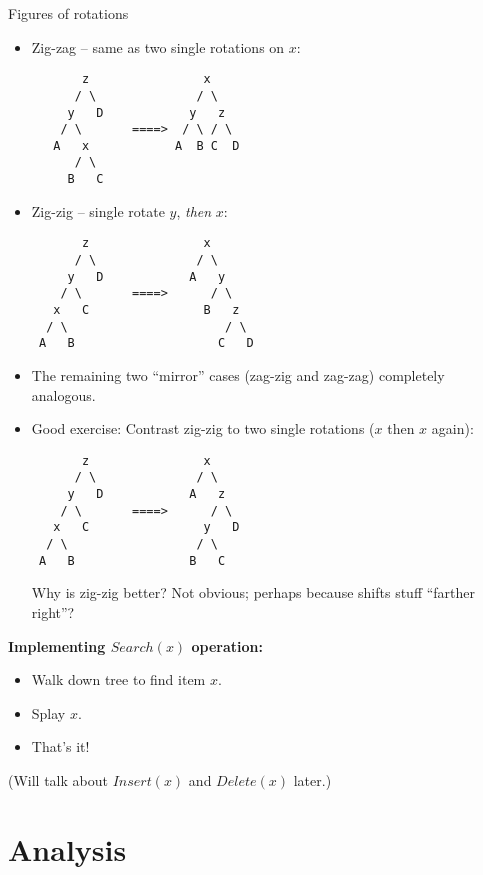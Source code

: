 \documentclass{article}
\begin{document}
Figures of rotations
\begin{itemize}
\item Zig-zag -- same as two single rotations on $x$:
\begin{verbatim}
       z                x
      / \              / \
     y   D            y   z
    / \       ====>  / \ / \ 
   A   x            A  B C  D
      / \
     B   C
\end{verbatim}
\item Zig-zig -- single rotate $y$, \emph{then} $x$:
\begin{verbatim}
       z                x
      / \              / \
     y   D            A   y
    / \       ====>      / \
   x   C                B   z
  / \                      / \   
 A   B                    C   D
\end{verbatim}
\item The remaining two ``mirror'' cases (zag-zig and zag-zag) completely analogous.
\item Good exercise: Contrast zig-zig to two single rotations ($x$ then $x$ again):
\begin{verbatim}
       z                x
      / \              / \
     y   D            A   z
    / \       ====>      / \
   x   C                y   D
  / \                  / \   
 A   B                B   C
\end{verbatim}
Why is zig-zig better?  Not obvious; perhaps because shifts stuff
``farther right''?
\end{itemize}

{\bf Implementing $Search(x)$ operation:}
\begin{itemize}
\item Walk down tree to find item $x$.
\item Splay $x$.
\item That's it!
\end{itemize}

(Will talk about $Insert(x)$ and $Delete(x)$ later.)

\section{Analysis}
\end{document}
